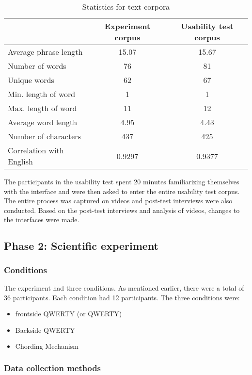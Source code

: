 \begin{table}
	\centering
		\begin{tabular}{|l|c|c|} \hline
		                         & Experiment corpus & Usability test corpus \\ \hline
			 Average phrase length & 15.07 & 15.67 \\ \hline
			 Number of words & 76 & 81 \\ \hline
			 Unique words & 62 & 67 \\ \hline
			 Min. length of word & 1 & 1 \\ \hline
			 Max. length of word & 11 & 12 \\ \hline
			 Average word length & 4.95 & 4.43 \\ \hline
			 Number of characters & 437 & 425 \\ \hline
			 Correlation with English & 0.9297 & 0.9377 \\ \hline
		\end{tabular}
	\caption{Statistics for text corpora}
	\label{tab:StatisticsForTextCorpora}
\end{table}

The participants in the usability test spent 20 minutes familiarizing
themselves with the interface and were then asked to enter the entire
usability test corpus. The entire process was captured on videos and
post-test interviews were also conducted. Based on the post-test
interviews and analysis of videos, changes to the interfaces were
made.

\subsection{Phase 2: Scientific experiment}
\subsubsection{Conditions}

The experiment had three conditions. As mentioned earlier, there were
a total of 36 participants. Each condition had 12 participants. The
three conditions were:

\begin{itemize}
	\item frontside QWERTY (or QWERTY)
	\item Backside QWERTY
	\item Chording Mechanism
\end{itemize}
\subsubsection{Data collection methods}

